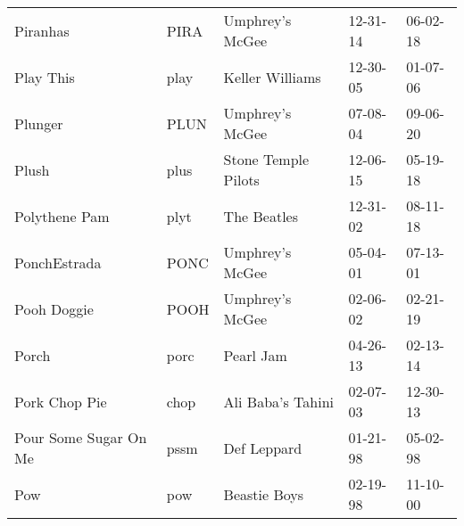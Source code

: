\begin{longtable}{p{}p{}p{}p{}p{}}
                                                                Piranhas &          PIRA &                                          Umphrey's McGee &              12-31-14 &             06-02-18 \\
                                                               Play This &          play &                                          Keller Williams &              12-30-05 &             01-07-06 \\
                                                                 Plunger &          PLUN &                                          Umphrey's McGee &              07-08-04 &             09-06-20 \\
                                                                   Plush &          plus &                                      Stone Temple Pilots &              12-06-15 &             05-19-18 \\
                                                           Polythene Pam &          plyt &                                              The Beatles &              12-31-02 &             08-11-18 \\
                                                            PonchEstrada &          PONC &                                          Umphrey's McGee &              05-04-01 &             07-13-01 \\
                                                             Pooh Doggie &          POOH &                                          Umphrey's McGee &              02-06-02 &             02-21-19 \\
                                                                   Porch &          porc &                                                Pearl Jam &              04-26-13 &             02-13-14 \\
                                                           Pork Chop Pie &          chop &                                        Ali Baba's Tahini &              02-07-03 &             12-30-13 \\
                                                   Pour Some Sugar On Me &          pssm &                                              Def Leppard &              01-21-98 &             05-02-98 \\
                                                                     Pow &           pow &                                             Beastie Boys &              02-19-98 &             11-10-00 \\

\end{longtable}
